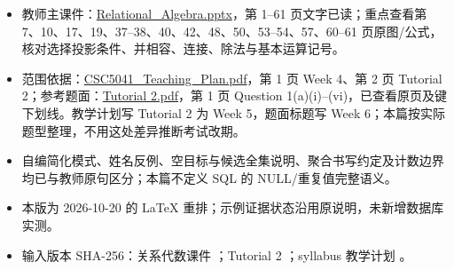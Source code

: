\begin{itemize}
\tightlist
\item
  教师主课件：\href{../../../slides/Relational_Algebra.pptx}{Relational\_Algebra.pptx}，第 1--61 页文字已读；重点查看第 7、10、17、19、37--38、40、42、48、50、53--54、57、60--61 页原图/公式，核对选择投影条件、并相容、连接、除法与基本运算记号。
\item
  范围依据：\href{../../../syllabus/CSC5041_Teaching_Plan.pdf}{CSC5041\_Teaching\_Plan.pdf}，第 1 页 Week 4、第 2 页 Tutorial 2；参考题面：\href{../../../slides/Tutorial\%202.pdf}{Tutorial 2.pdf}，第 1 页 Question 1(a)(i)--(vi)，已查看原页及键下划线。教学计划写 Tutorial 2 为 Week 5，题面标题写 Week 6；本篇按实际题型整理，不用这处差异推断考试改期。
\item
  自编简化模式、姓名反例、空目标与候选全集说明、聚合书写约定及计数边界均已与教师原句区分；本篇不定义 SQL 的 NULL/重复值完整语义。
\item
  本版为 2026-10-20 的 LaTeX 重排；示例证据状态沿用原说明，未新增数据库实测。
\item
  输入版本 SHA-256：关系代数课件 \texttt{}；Tutorial 2 \texttt{}；syllabus 教学计划 \texttt{}。
\end{itemize}
